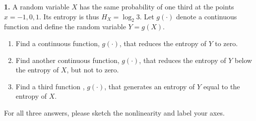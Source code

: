 \textbf{1.} A random variable $X$ has the same probability of one third at the points $x=-1,0,1.$  Its entropy is thus $H_X = \log_2 3.$ Let $g(\cdot) $ denote a continuous function and define the random variable $Y=g(X)$.
\begin{enumerate} \item  Find a continuous function, $g(\cdot )$, that reduces the entropy of $Y$ to zero.
\item  Find another continuous function, $g(\cdot )$, that reduces the entropy of $Y$ below the entropy of $X$, but not to zero.
\item  Find a third function , $g(\cdot )$, that generates an entropy of $Y$ equal to the entropy of $X$.
\end{enumerate}
For all three answers, please sketch the nonlinearity and label your axes.

